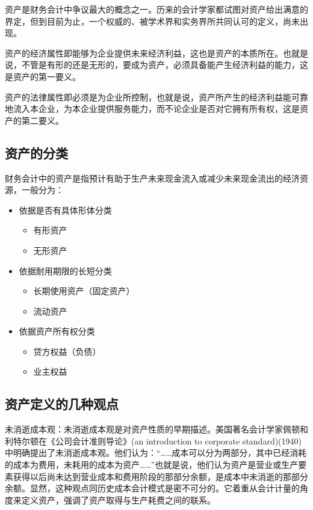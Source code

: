     资产是财务会计中争议最大的概念之一。历来的会计学家都试图对资产给出满意的界定，但到目前为止，一个权威的、被学术界和实务界所共同认可的定义，尚未出现。

    资产的经济属性即能够为企业提供未来经济利益，这也是资产的本质所在。也就是说，不管是有形的还是无形的，要成为资产，必须具备能产生经济利益的能力，这是资产的第一要义。

    资产的法律属性即必须是为企业所控制，也就是说，资产所产生的经济利益能可靠地流入本企业，为本企业提供服务能力，而不论企业是否对它拥有所有权，这是资产的第二要义。　　

\subsection {资产的分类}

    财务会计中的资产是指预计有助于生产未来现金流入或减少未来现金流出的经济资源，一般分为：

    \begin{itemize}
        \item  依据是否有具体形体分类
            \begin{itemize}
                \item  有形资产
                \item  无形资产
            \end{itemize}

        \item  依据耐用期限的长短分类
            \begin{itemize}
                \item  长期使用资产（固定资产）
                \item  流动资产
            \end{itemize}

        \item  依据资产所有权分类
            \begin{itemize}
                \item  贷方权益（负债）
                \item  业主权益
            \end{itemize}
    \end{itemize}

\subsection {资产定义的几种观点}

    未消逝成本观：未消逝成本观是对资产性质的早期描述。美国著名会计学家佩顿和利特尔顿在《公司会计准则导论》(an introduction to corporate standard)(1940)中明确提出了未消逝成本观。他们认为：“……成本可以分为两部分，其中已经消耗的成本为费用，未耗用的成本为资产……”也就是说，他们认为资产是营业或生产要素获得以后尚未达到营业成本和费用阶段的那部分余额，是成本中未消逝的那部分余额。显然，这种观点同历史成本会计模式是密不可分的。它着重从会计计量的角度来定义资产，强调了资产取得与生产耗费之间的联系。


